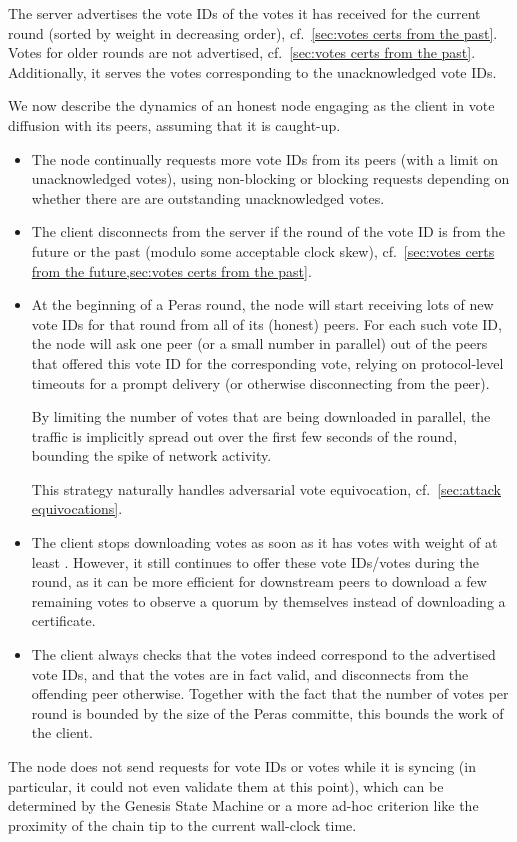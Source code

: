 The server advertises the vote IDs of the votes it has received for the current round (sorted by weight in decreasing order), cf.~\cref{sec:votes certs from the past}.
Votes for older rounds are not advertised, cf.~\cref{sec:votes certs from the past}.
Additionally, it serves the votes corresponding to the unacknowledged vote IDs.

We now describe the dynamics of an honest node engaging as the client in vote diffusion with its peers, assuming that it is caught-up.
\begin{itemize}
\item
  The node continually requests more vote IDs from its peers (with a limit on unacknowledged votes), using non-blocking or blocking requests depending on whether there are are outstanding unacknowledged votes.
\item
  The client disconnects from the server if the round of the vote ID is from the future or the past (modulo some acceptable clock skew), cf.~\cref{sec:votes certs from the future,sec:votes certs from the past}.
\item
  At the beginning of a Peras round, the node will start receiving lots of new vote IDs for that round from all of its (honest) peers.
  For each such vote ID, the node will ask one peer (or a small number in parallel) out of the peers that offered this vote ID for the corresponding vote, relying on protocol-level timeouts for a prompt delivery (or otherwise disconnecting from the peer).

  By limiting the number of votes that are being downloaded in parallel, the traffic is implicitly spread out over the first few seconds of the round, bounding the spike of network activity.

  This strategy naturally handles adversarial vote equivocation, cf.~\cref{sec:attack equivocations}.
\item
  The client stops downloading votes as soon as it has votes with weight of at least \perasQuorum{}.
  However, it still continues to offer these vote IDs/votes during the round, as it can be more efficient for downstream peers to download a few remaining votes to observe a quorum by themselves instead of downloading a certificate.
\item
  The client always checks that the votes indeed correspond to the advertised vote IDs, and that the votes are in fact valid, and disconnects from the offending peer otherwise.
  Together with the fact that the number of votes per round is bounded by the size of the Peras committe, this bounds the work of the client.
\end{itemize}
The node does not send requests for vote IDs or votes while it is syncing (in particular, it could not even validate them at this point), which can be determined by the Genesis State Machine \parencite{genesis-implementation-documentation} or a more ad-hoc criterion like the proximity of the chain tip to the current wall-clock time.


